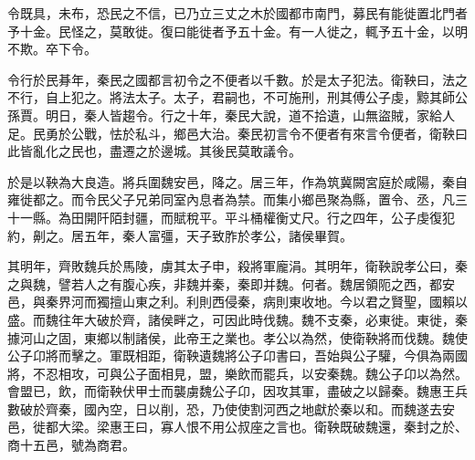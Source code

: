 令既具，未布，恐民之不信，已乃立三丈之木於國都市南門，募民有能徙置北門者予十金。民怪之，莫敢徙。復曰能徙者予五十金。有一人徙之，輒予五十金，以明不欺。卒下令。

令行於民朞年，秦民之國都言初令之不便者以千數。於是太子犯法。衛鞅曰，法之不行，自上犯之。將法太子。太子，君嗣也，不可施刑，刑其傅公子虔，黥其師公孫賈。明日，秦人皆趨令。行之十年，秦民大說，道不拾遺，山無盜賊，家給人足。民勇於公戰，怯於私斗，鄉邑大治。秦民初言令不便者有來言令便者，衛鞅曰此皆亂化之民也，盡遷之於邊城。其後民莫敢議令。

於是以鞅為大良造。將兵圍魏安邑，降之。居三年，作為筑冀闕宮庭於咸陽，秦自雍徙都之。而令民父子兄弟同室內息者為禁。而集小鄉邑聚為縣，置令、丞，凡三十一縣。為田開阡陌封疆，而賦稅平。平斗桶權衡丈尺。行之四年，公子虔復犯約，劓之。居五年，秦人富彊，天子致胙於孝公，諸侯畢賀。

其明年，齊敗魏兵於馬陵，虜其太子申，殺將軍龐涓。其明年，衛鞅說孝公曰，秦之與魏，譬若人之有腹心疾，非魏并秦，秦即并魏。何者。魏居領阨之西，都安邑，與秦界河而獨擅山東之利。利則西侵秦，病則東收地。今以君之賢聖，國賴以盛。而魏往年大破於齊，諸侯畔之，可因此時伐魏。魏不支秦，必東徙。東徙，秦據河山之固，東鄉以制諸侯，此帝王之業也。孝公以為然，使衛鞅將而伐魏。魏使公子卬將而擊之。軍既相距，衛鞅遺魏將公子卬書曰，吾始與公子驩，今俱為兩國將，不忍相攻，可與公子面相見，盟，樂飲而罷兵，以安秦魏。魏公子卬以為然。會盟已，飲，而衛鞅伏甲士而襲虜魏公子卬，因攻其軍，盡破之以歸秦。魏惠王兵數破於齊秦，國內空，日以削，恐，乃使使割河西之地獻於秦以和。而魏遂去安邑，徙都大梁。梁惠王曰，寡人恨不用公叔座之言也。衛鞅既破魏還，秦封之於、商十五邑，號為商君。

